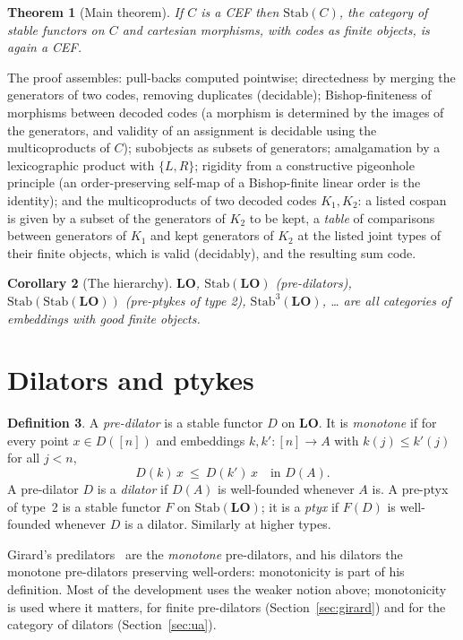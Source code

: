 \documentclass[11pt]{article}
\newtheorem{theorem}{Theorem}[section]
\newtheorem{corollary}[theorem]{Corollary}
\theoremstyle{definition}
\newtheorem{definition}[theorem]{Definition}
\theoremstyle{remark}
\newcommand{\Stab}{\mathrm{Stab}}
\newcommand{\LO}{\mathbf{LO}}
\begin{document}
\begin{theorem}[Main theorem]
If $C$ is a CEF then $\Stab(C)$, the category of stable functors on $C$
and cartesian morphisms, with codes as finite objects, is again a CEF.
\end{theorem}

The proof assembles: pull-backs computed pointwise; directedness by
merging the generators of two codes, removing duplicates (decidable);
Bishop-finiteness of morphisms between decoded codes (a morphism is
determined by the images of the generators, and validity of an assignment is
decidable using the multicoproducts of $C$); subobjects as subsets of
generators; amalgamation by a lexicographic product with $\{L,R\}$;
rigidity from a constructive pigeonhole principle (an order-preserving
self-map of a Bishop-finite linear order is the identity); and the
multicoproducts of two decoded codes $K_1,K_2$: a listed cospan is given by
a subset of the generators of $K_2$ to be kept, a \emph{table} of
comparisons between generators of $K_1$ and kept generators of $K_2$ at the
listed joint types of their finite objects, which is valid (decidably), and
the resulting sum code.

\begin{corollary}[The hierarchy]
$\LO$, $\Stab(\LO)$ (pre-dilators), $\Stab(\Stab(\LO))$ (pre-ptykes of
type 2), $\Stab^3(\LO)$, \dots{} are all categories of embeddings with good
finite objects.
\end{corollary}

\section{Dilators and ptykes}

\begin{definition}\label{def:dil}
A \emph{pre-dilator} is a stable functor $D$ on $\LO$. It is
\emph{monotone} if for every point $x\in D([n])$ and embeddings
$k,k':[n]\to A$ with $k(j)\le k'(j)$ for all $j<n$,
\[ D(k)\,x\ \le\ D(k')\,x \quad\text{in } D(A). \]
A pre-dilator $D$ is a \emph{dilator} if $D(A)$ is well-founded whenever
$A$ is. A pre-ptyx of type~2 is a stable functor $F$ on $\Stab(\LO)$; it is
a \emph{ptyx} if $F(D)$ is well-founded whenever $D$ is a dilator. Similarly
at higher types.
\end{definition}

Girard's predilators~\cite{Gir81,GirPTLC,GN} are the \emph{monotone}
pre-dilators, and his dilators the monotone pre-dilators preserving
well-orders: monotonicity is part of his definition. Most of the
development uses the weaker notion above; monotonicity is used where it
matters, for finite pre-dilators (Section~\ref{sec:girard}) and for the
category of dilators (Section~\ref{sec:ua}).
\end{document}
